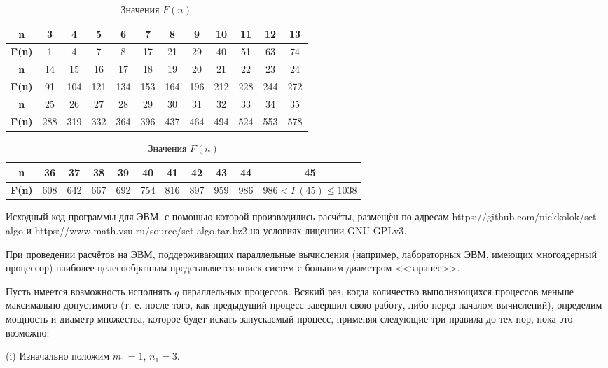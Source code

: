 \documentclass{article}
\begin{document}
\begin{table}[H]
\caption{Значения $F(n)$}
\label{tabular:pc_counted}
\begin{center}
\begin{tabular}{|c|c|c|c|c|c|c|c|c|c|c|c|}
\hline
\textbf{n}    &  3 & 4 & 5 & 6 &  7 &  8 &  9 & 10 & 11 & 12 & 13 \\
\hline
\textbf{F(n)} &  1 & 4 & 7 & 8 & 17 & 21 & 29 & 40 & 51 & 63 & 74  \\
\hline
\hline
\textbf{n}    &  14 &  15 &  16 &  17 &  18 &  19 &  20 &  21 &  22 &  23 &  24 \\
\hline
\textbf{F(n)} &  91 & 104 & 121 & 134 & 153 & 164 & 196 & 212 & 228 & 244 & 272  \\
\hline
\hline
\textbf{n}    &  25 &  26 &  27 &  28 &  29 &  30 &  31 &  32 &  33 &  34 &  35 \\
\hline
\textbf{F(n)} & 288 & 319 & 332 & 364 & 396 & 437 & 464 & 494 & 524 & 553 & 578  \\
\hline
\end{tabular}
\begin{tabular}{|c|c|c|c|c|c|c|c|c|c|c|}
\hline
\textbf{n}    &  36 &  37 &  38 &  39 &  40 &  41 &  42 &  43 &  44 & 45\\
\hline
\textbf{F(n)} & 608 & 642 & 667 & 692 & 754 & 816 & 897 & 959 & 986 & $986<F(45)\leq 1038$\\
\hline
\end{tabular}
\end{center}
\end{table}


Исходный код программы для ЭВМ, с помощью которой производились расчёты, размещён по адресам https://github.com/nickkolok/sct-algo и https://www.math.vsu.ru/source/sct-algo.tar.bz2 на условиях лицензии GNU GPLv3.


При проведении расчётов на ЭВМ, поддерживающих параллельные вычисления (например, лабораторных ЭВМ, имеющих многоядерный процессор) наиболее целесообразным представляется поиск систем с большим диаметром <<заранее>>.

Пусть имеется возможность исполнять $q$ параллельных процессов.
Всякий раз, когда количество выполняющихся процессов меньше максимально допустимого (т. е. после того, как предыдущий процесс завершил свою работу, либо перед началом вычислений), определим мощность и диаметр множества, которое будет искать запускаемый процесс, применяя следующие три правила до тех пор, пока это возможно:

(i)
Изначально положим $m_1=1$, $n_1=3$.
\end{document}

